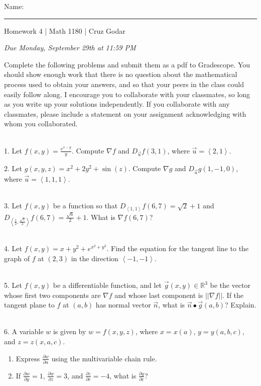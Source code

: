 \documentclass{article}
\begin{document}
\Large Name: \rule{2in}{0.15mm} \hfill Homework 4 | Math 1180 | Cruz Godar \vspace{4pt} \normalsize

\textit{Due Monday, September 29th at 11:59 PM}

Complete the following problems and submit them as a pdf to Gradescope. You should show enough work that there is no question about the mathematical process used to obtain your answers, and so that your peers in the class could easily follow along. I encourage you to collaborate with your classmates, so long as you write up your solutions independently. If you collaborate with any classmates, please include a statement on your assignment acknowledging with whom you collaborated.

~\\

1. Let $f(x, y) = \frac{e^{x - y}}{y}$. Compute $\nabla\! f$ and $D_{\vec{u}}f(3, 1)$, where $\vec{u} = \left< 2, 1 \right>$.

2. Let $g(x, y, z) = x^2 + 2y^2 + \sin(z)$. Compute $\nabla\! g$ and $D_{\vec{u}}g(1, -1, 0)$, where $\vec{u} = \left< 1, 1, 1 \right>$.

~\\

3. Let $f(x, y)$ be a function so that $D_{\left< 1, 1 \right>}f(6, 7) = \sqrt{2} + 1$ and $D_{\left< \frac{1}{2}, \frac{\sqrt{3}}{2} \right>}f(6, 7) = \frac{\sqrt{6}}{2} + 1$. What is $\nabla\! f (6, 7)$?

~\\

4. Let $f(x, y) = x + y^2 + e^{x^2 + y^2}$. Find the equation for the tangent line to the graph of $f$ at $(2, 3)$ in the direction $\left< -1, -1 \right>$.

~\\

5. Let $f(x, y)$ be a differentiable function, and let $\vec{g}(x, y) \in \mathbb{R}^3$ be the vector whose first two components are $\nabla\! f$ and whose last component is $\left| \left| \nabla\! f \right| \right|$. If the tangent plane to $f$ at $(a, b)$ has normal vector $\vec{n}$, what is $\vec{n} \bullet \vec{g}(a, b)$? Explain.

~\\

6. A variable $w$ is given by $w = f(x, y, z)$, where $x = x(a)$, $y = y(a, b, c)$, and $z = z(x, a, c)$.

\begin{enumerate}

	\item Express $\frac{\partial w}{\partial a}$ using the multivariable chain rule.

	\item If $\frac{\partial w}{\partial y} = 1$, $\frac{\partial w}{\partial z} = 3$, and $\frac{\partial z}{\partial c} = -4$, what is $\frac{\partial y}{\partial c}$?

\end{enumerate}
\end{document}
